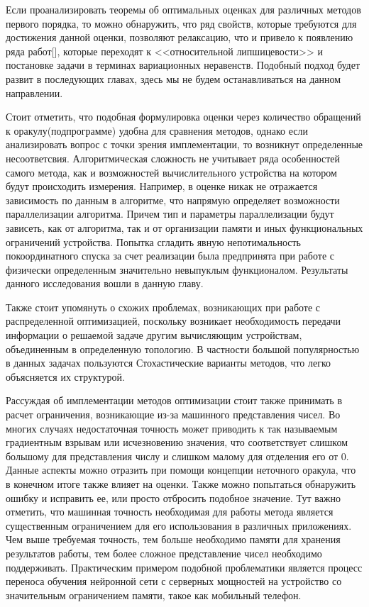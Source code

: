   Если проанализировать теоремы об оптимальных оценках для различных методов первого порядка, то можно обнаружить, что ряд свойств, которые требуются для достижения данной оценки, позволяют релаксацию, что и привело к появлению ряда работ[], которые переходят к <<относительной липшицевости>> и постановке задачи в терминах вариационных неравенств. Подобный подход будет развит в последующих главах, здесь мы не будем останавливаться на данном направлении.

  Стоит отметить, что подобная формулировка оценки через количество обращений к оракулу(подпрограмме) удобна для сравнения методов, однако если анализировать вопрос с точки зрения имплементации, то возникнут определенные несоответсвия. Алгоритмическая сложность не учитывает ряда особенностей самого метода, как и возможностей вычислительного устройства на котором будут происходить измерения. Например, в оценке никак не отражается зависимость по данным в алгоритме, что напрямую определяет возможности параллелизации алгоритма. Причем тип и параметры параллелизации будут зависеть, как от алгоритма, так и от организации памяти и иных функциональных ограничений устройства. Попытка сгладить явную непотимальность покоординатного спуска за счет реализации была предпринята при работе с физически определенным значительно невыпуклым функционалом. Результаты данного исследования вошли в данную главу. 

  Также стоит упомянуть о схожих проблемах, возникающих при работе с распределенной оптимизацией, поскольку возникает необходимость передачи информации о решаемой задаче другим вычисляющим устройствам, объединенным в определенную топологию. В частности большой популярностью в данных задачах пользуются Стохастические варианты методов, что легко объясняется их структурой. 

  Рассуждая об имплементации методов оптимизации стоит также принимать в расчет ограничения, возникающие из-за машинного представления чисел. Во многих случаях недостаточная точность может приводить к так называемым градиентным взрывам или исчезновению значения, что соответствует слишком большому для представления числу и слишком малому для отделения его от 0. Данные аспекты можно отразить при помощи концепции неточного оракула, что в конечном итоге также влияет на оценки. Также можно попытаться обнаружить ошибку и исправить ее, или просто отбросить подобное значение. Тут важно отметить, что машинная точность необходимая для работы метода является существенным ограничением для его использования в различных приложениях. Чем выше требуемая точность, тем больше необходимо памяти для хранения результатов работы, тем более сложное представление чисел необходимо поддерживать. Практическим примером подобной проблематики является процесс переноса обучения нейронной сети с серверных мощностей на устройство со значительным ограничением памяти, такое как мобильный телефон. 


